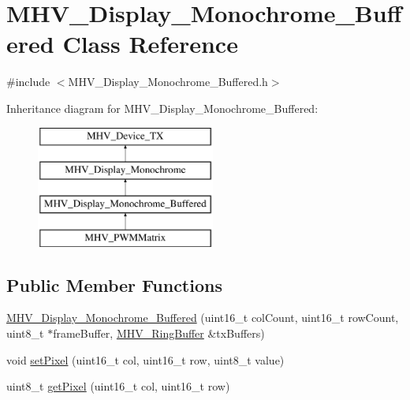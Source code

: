 \hypertarget{class_m_h_v___display___monochrome___buffered}{
\section{\-M\-H\-V\-\_\-\-Display\-\_\-\-Monochrome\-\_\-\-Buffered \-Class \-Reference}
\label{class_m_h_v___display___monochrome___buffered}
}


{\ttfamily \#include $<$\-M\-H\-V\-\_\-\-Display\-\_\-\-Monochrome\-\_\-\-Buffered.\-h$>$}

\-Inheritance diagram for \-M\-H\-V\-\_\-\-Display\-\_\-\-Monochrome\-\_\-\-Buffered\-:\begin{figure}[H]
\begin{center}
\leavevmode
\includegraphics[height=4.000000cm]{class_m_h_v___display___monochrome___buffered}
\end{center}
\end{figure}
\subsection*{\-Public \-Member \-Functions}
\begin{DoxyCompactItemize}
\item 
\hyperlink{class_m_h_v___display___monochrome___buffered_a6420db3c367f7487273184b7e0d8ba70}{\-M\-H\-V\-\_\-\-Display\-\_\-\-Monochrome\-\_\-\-Buffered} (uint16\-\_\-t col\-Count, uint16\-\_\-t row\-Count, uint8\-\_\-t $\ast$frame\-Buffer, \hyperlink{class_m_h_v___ring_buffer}{\-M\-H\-V\-\_\-\-Ring\-Buffer} \&tx\-Buffers)
\item 
void \hyperlink{class_m_h_v___display___monochrome___buffered_afc17261971874f319878629d90f7f426}{set\-Pixel} (uint16\-\_\-t col, uint16\-\_\-t row, uint8\-\_\-t value)
\item 
uint8\-\_\-t \hyperlink{class_m_h_v___display___monochrome___buffered_a134f42819a667a3aafb60a3fd432ef12}{get\-Pixel} (uint16\-\_\-t col, uint16\-\_\-t row)
\end{DoxyCompactItemize}
